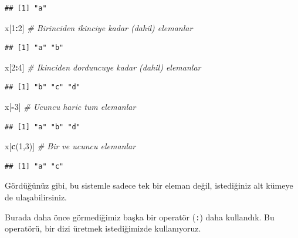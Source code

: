 \documentclass[
]{book}
\newenvironment{Shaded}{\begin{snugshade}}{\end{snugshade}}
\newcommand{\CommentTok}[1]{\textcolor[rgb]{0.56,0.35,0.01}{\textit{#1}}}
\newcommand{\DecValTok}[1]{\textcolor[rgb]{0.00,0.00,0.81}{#1}}
\newcommand{\KeywordTok}[1]{\textcolor[rgb]{0.13,0.29,0.53}{\textbf{#1}}}
\newcommand{\NormalTok}[1]{#1}
\newcommand{\OperatorTok}[1]{\textcolor[rgb]{0.81,0.36,0.00}{\textbf{#1}}}
\begin{document}
\begin{verbatim}
## [1] "a"
\end{verbatim}

\begin{Shaded}
\begin{Highlighting}[]
\NormalTok{x[}\DecValTok{1}\OperatorTok{:}\DecValTok{2}\NormalTok{] }\CommentTok{\# Birinciden ikinciye kadar (dahil) elemanlar}
\end{Highlighting}
\end{Shaded}

\begin{verbatim}
## [1] "a" "b"
\end{verbatim}

\begin{Shaded}
\begin{Highlighting}[]
\NormalTok{x[}\DecValTok{2}\OperatorTok{:}\DecValTok{4}\NormalTok{] }\CommentTok{\# Ikinciden dorduncuye kadar (dahil) elemanlar}
\end{Highlighting}
\end{Shaded}

\begin{verbatim}
## [1] "b" "c" "d"
\end{verbatim}

\begin{Shaded}
\begin{Highlighting}[]
\NormalTok{x[}\OperatorTok{{-}}\DecValTok{3}\NormalTok{] }\CommentTok{\# Ucuncu haric tum elemanlar}
\end{Highlighting}
\end{Shaded}

\begin{verbatim}
## [1] "a" "b" "d"
\end{verbatim}

\begin{Shaded}
\begin{Highlighting}[]
\NormalTok{x[}\KeywordTok{c}\NormalTok{(}\DecValTok{1}\NormalTok{,}\DecValTok{3}\NormalTok{)] }\CommentTok{\# Bir ve ucuncu elemanlar}
\end{Highlighting}
\end{Shaded}

\begin{verbatim}
## [1] "a" "c"
\end{verbatim}

Gördüğünüz gibi, bu sistemle sadece tek bir eleman değil, istediğiniz alt kümeye de ulaşabilirsiniz.

Burada daha önce görmediğimiz başka bir operatör (\texttt{:}) daha kullandık. Bu operatörü, bir dizi üretmek istediğimizde kullanıyoruz.
\end{document}
